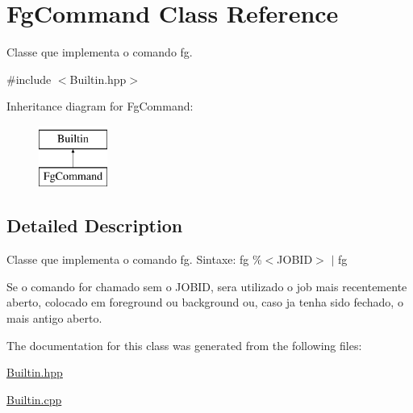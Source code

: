 \hypertarget{classFgCommand}{
\section{FgCommand Class Reference}
\label{classFgCommand}
}


Classe que implementa o comando fg.  




{\ttfamily \#include $<$Builtin.hpp$>$}

Inheritance diagram for FgCommand:\begin{figure}[H]
\begin{center}
\leavevmode
\includegraphics[height=2.000000cm]{classFgCommand}
\end{center}
\end{figure}


\subsection{Detailed Description}
Classe que implementa o comando fg. Sintaxe: fg \%$<$JOBID$>$ $|$ fg \par
 Se o comando for chamado sem o JOBID, sera utilizado o job mais recentemente aberto, colocado em foreground ou background ou, caso ja tenha sido fechado, o mais antigo aberto. 

The documentation for this class was generated from the following files:\begin{DoxyCompactItemize}
\item 
\hyperlink{Builtin_8hpp}{Builtin.hpp}\item 
\hyperlink{Builtin_8cpp}{Builtin.cpp}\end{DoxyCompactItemize}
